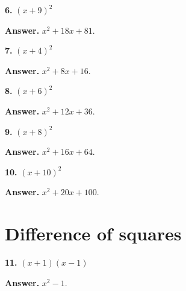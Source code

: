 \documentclass{ximera}
\begin{document}
\begin{problem}

\textbf{6.} $(x+9)^{2}$

\begin{hint}
\textbf{Answer.} $x^{2} + 18 x + 81$.
\end{hint}
\end{problem}

\begin{problem}

\textbf{7.} $(x+4)^{2}$

\begin{hint}
\textbf{Answer.} $x^{2} + 8 x + 16$.
\end{hint}
\end{problem}

\begin{problem}

\textbf{8.} $(x+6)^{2}$

\begin{hint}
\textbf{Answer.} $x^{2} + 12 x + 36$.
\end{hint}
\end{problem}

\begin{problem}

\textbf{9.} $(x+8)^{2}$

\begin{hint}
\textbf{Answer.} $x^{2} + 16 x + 64$.
\end{hint}
\end{problem}

\begin{problem}

\textbf{10.} $(x+10)^{2}$

\begin{hint}
\textbf{Answer.} $x^{2} + 20 x + 100$.
\end{hint}
\end{problem}

\section*{Difference of squares}


\begin{problem}

\textbf{11.} $(x+1)(x-1)$

\begin{hint}
\textbf{Answer.} $x^{2} - 1$.
\end{hint}
\end{problem}
\end{document}
